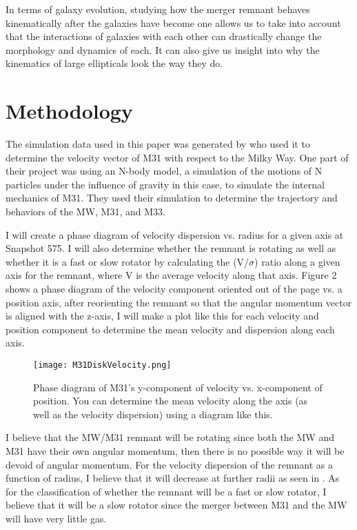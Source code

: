 \documentclass[twocolumn]{aastex63}
\begin{document}
In terms of galaxy evolution, studying how the merger remnant behaves kinematically after the galaxies have become one allows us to take into account that the interactions of galaxies with each other can drastically change the morphology and dynamics of each.  It can also give us insight into why the kinematics of large ellipticals look the way they do.  

\section{Methodology} \label{sec:style}

The simulation data used in this paper was generated by \cite{2012ApJ...753....8V} who used it to determine the velocity vector of M31 with respect to the Milky Way.  One part of their project was using an N-body model, a simulation of the motions of N particles under the influence of gravity in this case, to simulate the internal mechanics of M31. They used their simulation to determine the trajectory and behaviors of the MW, M31, and M33.        

I will create a phase diagram of velocity dispersion vs. radius for a given axis at Snapshot 575.  I will also determine whether the remnant is rotating as well as whether it is a fast or slow rotator by calculating the (V/$\sigma$) ratio along a given axis for the remnant, where V is the average velocity along that axis.  Figure 2 shows a phase diagram of the velocity component oriented out of the page vs. a position axis, after reorienting the remnant so that the angular momentum vector is aligned with the z-axis, I will make a plot like this for each velocity and position component to determine the mean velocity and dispersion along each axis.  

\vspace{3mm} %
\begin{figure}[h]
    \centering
    \texttt{[image: M31DiskVelocity.png]}
    \caption{Phase diagram of M31's y-component of velocity vs. x-component of position.  You can determine the mean velocity along the axis (as well as the velocity dispersion) using a diagram like this.}
    \label{fig:my_label}
\end{figure}



I believe that the MW/M31 remnant will be rotating since both the MW and M31 have their own angular momentum, then there is no possible way it will be devoid of angular momentum.  For the velocity dispersion of the remnant as a function of radius, I believe that it will decrease at further radii as seen in \cite{2003Sci...301.1696R}.  As for the classification of whether the remnant will be a fast or slow rotator, I believe that it will be a slow rotator since the merger between M31 and the MW will have very little gas.   




{}

\end{document}
